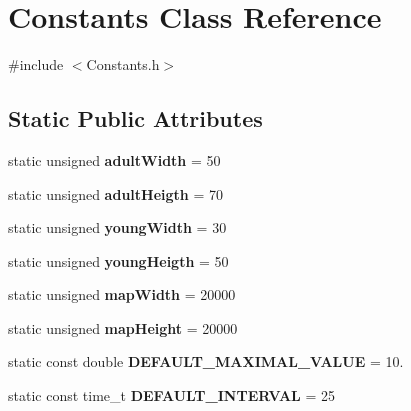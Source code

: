 \hypertarget{class_constants}{}\section{Constants Class Reference}
\label{class_constants}


{\ttfamily \#include $<$Constants.\+h$>$}

\subsection*{Static Public Attributes}
\begin{DoxyCompactItemize}
\item 
\hypertarget{class_constants_ab2eed82cd8de585b6c0d06741379cf1e}{}static unsigned {\bfseries adult\+Width} = 50\label{class_constants_ab2eed82cd8de585b6c0d06741379cf1e}

\item 
\hypertarget{class_constants_a517b6f74c71e1c6baab9da5d38d5a6ee}{}static unsigned {\bfseries adult\+Heigth} = 70\label{class_constants_a517b6f74c71e1c6baab9da5d38d5a6ee}

\item 
\hypertarget{class_constants_a336c33767b0d7a3ccbe90aae02b8f82a}{}static unsigned {\bfseries young\+Width} = 30\label{class_constants_a336c33767b0d7a3ccbe90aae02b8f82a}

\item 
\hypertarget{class_constants_a231d253282e7ea22d3bccf9b657a4277}{}static unsigned {\bfseries young\+Heigth} = 50\label{class_constants_a231d253282e7ea22d3bccf9b657a4277}

\item 
\hypertarget{class_constants_a0c171be2d5b8d39fd258ecae4eaabd5a}{}static unsigned {\bfseries map\+Width} = 20000\label{class_constants_a0c171be2d5b8d39fd258ecae4eaabd5a}

\item 
\hypertarget{class_constants_ab9c6d7080df54bb9a092560b4e31c55c}{}static unsigned {\bfseries map\+Height} = 20000\label{class_constants_ab9c6d7080df54bb9a092560b4e31c55c}

\item 
\hypertarget{class_constants_a5b3d745b3930454e9ead9c0c3ce7e98a}{}static const double {\bfseries D\+E\+F\+A\+U\+L\+T\+\_\+\+M\+A\+X\+I\+M\+A\+L\+\_\+\+V\+A\+L\+U\+E} = 10.\label{class_constants_a5b3d745b3930454e9ead9c0c3ce7e98a}

\item 
\hypertarget{class_constants_a6d6f2bf576a47801ca093b9540d7436f}{}static const time\+\_\+t {\bfseries D\+E\+F\+A\+U\+L\+T\+\_\+\+I\+N\+T\+E\+R\+V\+A\+L} = 25\label{class_constants_a6d6f2bf576a47801ca093b9540d7436f}


\end{DoxyCompactItemize}
